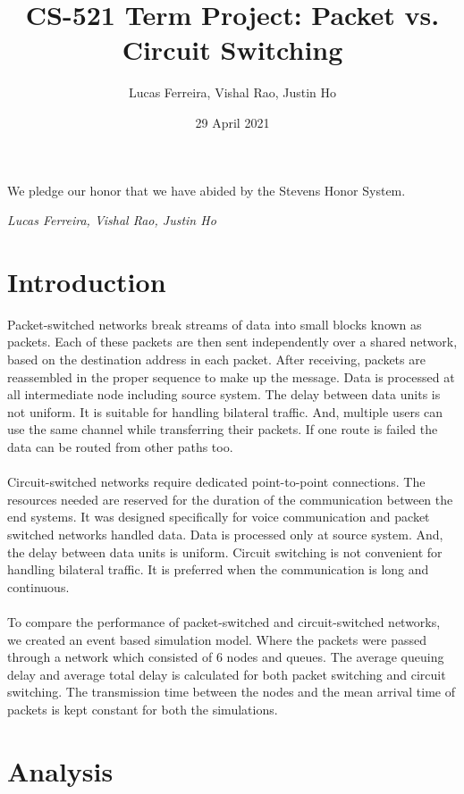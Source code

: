 \documentclass{article}
\title{CS-521 Term Project: Packet vs. Circuit Switching}
\author{Lucas Ferreira, Vishal Rao, Justin Ho}
\date{29 April 2021}
\begin{document}
  \maketitle

  {\flushleft We pledge our honor that we have abided by the Stevens Honor System.

  \textit{Lucas Ferreira, Vishal Rao, Justin Ho}}

  \section{Introduction}
  
  Packet-switched networks break streams of data into small blocks known as packets. Each of these packets are then sent independently over a shared network, based on the destination address in each packet. After receiving, packets are reassembled in the proper sequence to make up the message. Data is processed at all intermediate node including source system. The delay between data units is not uniform. It is suitable for handling bilateral traffic. And, multiple users can use the same channel while transferring their packets. If one route is failed the data can be routed from other paths too.\\\\
  Circuit-switched networks require dedicated point-to-point connections. The resources needed are reserved for the duration of the communication between the end systems. It was designed specifically for voice communication and packet switched networks handled data. Data is processed only at source system. And, the delay between data units is uniform. Circuit switching is not convenient for handling bilateral traffic. It is preferred when the communication is long and continuous.\\\\
  To compare the performance of packet-switched and circuit-switched networks, we created an event based simulation model. Where the packets were passed through a network which consisted of 6 nodes and queues. The average queuing delay and average total delay is calculated for both packet switching and circuit switching. The transmission time between the nodes and the mean arrival time of packets is kept constant for both the simulations. 





  \section{Analysis}
\end{document}
